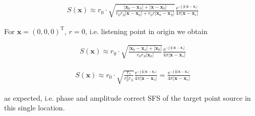 \documentclass[a4paper,BCOR=15mm,10pt,twoside]{scrartcl}
\newcommand\e{\mathrm{e}}  %
\newcommand\im{\mathrm{j}}  %
\newcommand\jwc{\im\,\frac{\omega}{c}}  %
\renewcommand{\vec}[1]{\mathbf{#1}}  %
\begin{document}
\begin{align}
S(\vec{x}) \approx r_0 \cdot
\sqrt{\frac{|\vec{x}_0-\vec{x}_S| + |\vec{x}-\vec{x}_0|}{r_0 r_S |\vec{x} -\vec{x}_0| + r_0 r |\vec{x}_0-\vec{x}_S|}}
\frac{\e^{-\jwc |\vec{x}-\vec{x}_s|}}{4 \pi |\vec{x}-\vec{x}_s|} 
\end{align}

For $\vec{x} = (0,0,0)^\mathrm{T}$, $r = 0$, i.e. listening point in origin we obtain

\begin{align}
S(\vec{x}) \approx r_0 \cdot
\sqrt{\frac{|\vec{x}_0-\vec{x}_s| + |\vec{x}_0|}{r_0 r_S |\vec{x}_0|}}
\frac{\e^{-\jwc |\vec{x}-\vec{x}_s|}}{4 \pi |\vec{x}-\vec{x}_s|} 
\end{align}

\begin{align}
S(\vec{x}) \approx r_0 \cdot
\sqrt{\frac{r_s}{r^2_0 r_S}}
\frac{\e^{-\jwc |\vec{x}-\vec{x}_s|}}{4 \pi |\vec{x}-\vec{x}_s|} =
\frac{\e^{-\jwc |\vec{x}-\vec{x}_s|}}{4 \pi |\vec{x}-\vec{x}_s|}
\end{align}

as expected, i.e. phase and amplitude correct SFS of the target point source in this single location.



\end{document}
